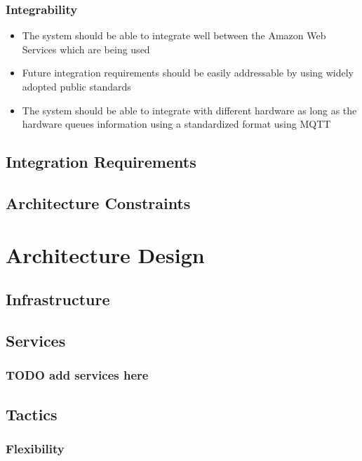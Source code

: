 \documentclass{article}
\begin{document}
		\subsubsection{Integrability}
			\begin{itemize}
				\item The system should be able to integrate well between the Amazon Web Services which are being used
				\item Future integration requirements should be easily addressable by using widely adopted public standards
				\item The system should be able to integrate with different hardware as long as the hardware queues information using a standardized format using MQTT
			\end{itemize}
	\subsection{Integration Requirements}
	\subsection{Architecture Constraints}

\section{Architecture Design}

\subsection{Infrastructure}

\subsection{Services}

\subsubsection{TODO add services here}

\subsection{Tactics}

\subsubsection{Flexibility}
\end{document}
